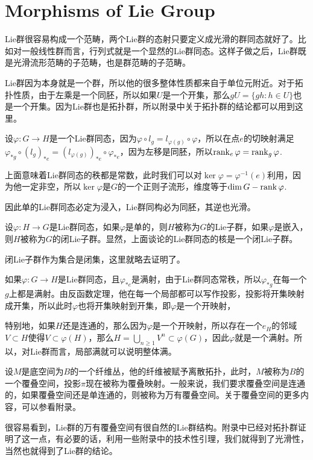 \section{Morphisms of Lie Group}

Lie群很容易构成一个范畴，两个Lie群的态射只要定义成光滑的群同态就好了。比如对一般线性群而言，行列式就是一个显然的Lie群同态。这样子做之后，Lie群既是光滑流形范畴的子范畴，也是群范畴的子范畴。

Lie群因为本身就是一个群，所以他的很多整体性质都来自于单位元附近。对于拓扑性质，由于左乘是一个同胚，所以如果$U$是一个开集，那么$gU=\{gh:h\in U\}$也是一个开集。因为Lie群也是拓扑群，所以附录中关于拓扑群的结论都可以用到这里。

\para 设$\varphi:G\to H$是一个Lie群同态，因为$\varphi\circ l_g=l_{\varphi(g)}\circ \varphi$，所以在点$e$的切映射满足$\varphi_{*g}\circ (l_g)_{*e}=(l_{\varphi(g)})_{*e}\circ \varphi_{*e}$，因为左移是同胚，所以$\operatorname{rank}_e \varphi=\operatorname{rank}_g \varphi$.

上面意味着Lie群同态的秩都是常数，此时我们可以对$\ker \varphi=\varphi^{-1}(e)$利用，因为他一定非空，所以$\ker \varphi$是$G$的一个正则子流形，维度等于$\dim G-\operatorname{rank} \varphi$.

\para 因此单的Lie群同态必定为浸入，Lie群同构必为同胚，其逆也光滑。

\para 设$\varphi:H\to G$是Lie群同态，如果$\varphi$是单的，则$H$被称为$G$的Lie子群，如果$\varphi$是嵌入，则$H$被称为$G$的闭Lie子群。显然，上面谈论的Lie群同态的核是一个闭Lie子群。

闭Lie子群作为集合是闭集，这里就略去证明了。

\para 如果$\varphi:G\to H$是Lie群同态，且$\varphi_{*e}$是满射，由于Lie群同态常秩，所以$\varphi_{*g}$在每一个$g$上都是满射。由反函数定理，他在每一个局部都可以写作投影，投影将开集映射成开集，所以此时$\varphi$也将开集映射到开集，即$\varphi$是一个开映射，

特别地，如果$H$还是连通的，那么因为$\varphi$是一个开映射，所以存在一个$e_H$的邻域$V\subset H$使得$V\subset \varphi(H)$，那么$H=\bigcup_{n\geq 1}V^n\subset \varphi(G)$，因此$\varphi$就是一个满射。所以，对Lie群而言，局部满就可以说明整体满。

\para \label{covering_space}设$M$是底空间为$B$的一个纤维丛，他的纤维被赋予离散拓扑，此时，$M$被称为$B$的一个覆叠空间，投影$\pi$现在被称为覆叠映射。一般来说，我们要求覆叠空间是连通的，如果覆叠空间还是单连通的，则被称为万有覆叠空间。关于覆叠空间的更多内容，可以参看附录。

很容易看到，Lie群的万有覆叠空间有很自然的Lie群结构。附录中已经对拓扑群证明了这一点，有必要的话，利用一些附录中的技术性引理，我们就得到了光滑性，当然也就得到了Lie群的结论。

